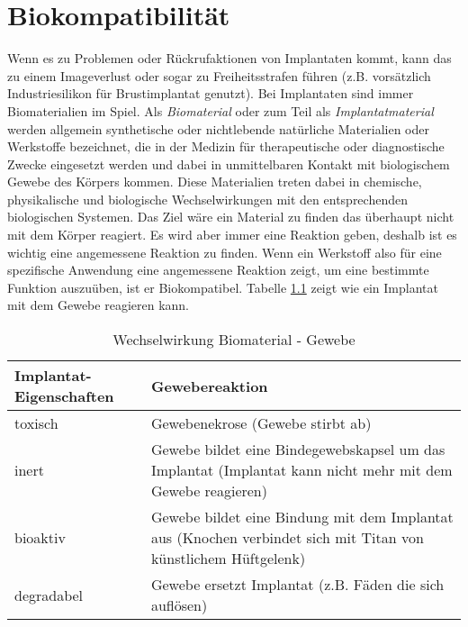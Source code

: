\chapter{Biokompatibilität}

Wenn es zu Problemen oder Rückrufaktionen von Implantaten kommt, kann das zu einem Imageverlust oder sogar zu Freiheitsstrafen führen (z.B. vorsätzlich Industriesilikon für Brustimplantat genutzt). Bei Implantaten sind immer Biomaterialien im Spiel. Als \textit{Biomaterial} oder zum Teil als \textit{Implantatmaterial} werden allgemein synthetische oder nichtlebende natürliche Materialien oder Werkstoffe bezeichnet, die in der Medizin für therapeutische oder diagnostische Zwecke eingesetzt werden und dabei in unmittelbaren Kontakt mit biologischem Gewebe des Körpers kommen. Diese Materialien treten dabei in chemische, physikalische und biologische Wechselwirkungen mit den entsprechenden biologischen Systemen. Das Ziel wäre ein Material zu finden das überhaupt nicht mit dem Körper reagiert. Es wird aber immer eine Reaktion geben, deshalb ist es wichtig eine angemessene Reaktion zu finden. Wenn ein Werkstoff also für eine spezifische Anwendung eine angemessene Reaktion zeigt, um eine bestimmte Funktion auszuüben, ist er Biokompatibel. Tabelle \ref{tab:wechselwirkung-biomaterial-gewebe} zeigt wie ein Implantat mit dem Gewebe reagieren kann.

\begin{table}
	\centering
	\small
	\renewcommand{\arraystretch}{1.5}
	\begin{tabular}{|l|p{10cm}|}
		\hline Implantat-Eigenschaften & Gewebereaktion \\ 
		\hline toxisch & Gewebenekrose (Gewebe stirbt ab) \\ 
		\hline inert & Gewebe bildet eine Bindegewebskapsel um das Implantat (Implantat kann nicht mehr mit dem Gewebe reagieren) \\ 
		\hline bioaktiv & Gewebe bildet eine Bindung mit dem Implantat aus (Knochen verbindet sich mit Titan von künstlichem Hüftgelenk) \\ 
		\hline degradabel & Gewebe ersetzt Implantat (z.B. Fäden die sich auflösen) \\ 
		\hline 
	\end{tabular} 
	\caption{Wechselwirkung Biomaterial - Gewebe}
	\label{tab:wechselwirkung-biomaterial-gewebe}
\end{table}

